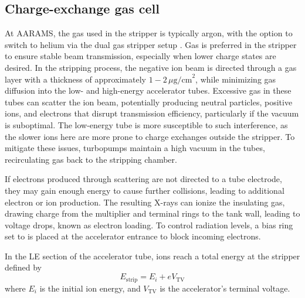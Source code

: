 \subsection{Charge-exchange gas cell}
At AARAMS, the gas used in the stripper is typically argon, with the option to switch to helium via the dual gas stripper setup \cite{Klein2014}. Gas is preferred in the stripper to ensure stable beam transmission, especially when lower charge states are desired. In the stripping process, the negative ion beam is directed through a gas layer with a thickness of approximately \(1-2 \, \mu \text{g/cm}^{2}\), while minimizing gas diffusion into the low- and high-energy accelerator tubes. Excessive gas in these tubes can scatter the ion beam, potentially producing neutral particles, positive ions, and electrons that disrupt transmission efficiency, particularly if the vacuum is suboptimal. The low-energy tube is more susceptible to such interference, as the slower ions here are more prone to charge exchanges outside the stripper. To mitigate these issues, turbopumps maintain a high vacuum in the tubes, recirculating gas back to the stripping chamber.

If electrons produced through scattering are not directed to a tube electrode, they may gain enough energy to cause further collisions, leading to additional electron or ion production. The resulting X-rays can ionize the insulating gas, drawing charge from the multiplier and terminal rings to the tank wall, leading to voltage drops, known as electron loading. To control radiation levels, a bias ring set to  is placed at the accelerator entrance to block incoming electrons.

In the LE section of the accelerator tube, ions reach a total energy at the stripper defined by
\begin{equation}
    E_{\text{strip}} = E_{i} + eV_{\text{TV}}
\end{equation}
where \(E_{i}\) is the initial ion energy, and \(V_{\text{TV}}\) is the accelerator's terminal voltage.

